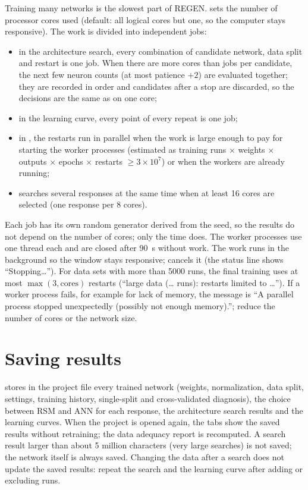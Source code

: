 Training many networks is the slowest part of REGEN.  sets the number of processor cores
used (default: all logical cores but one, so the computer stays responsive). The work is divided into independent
jobs:
\begin{itemize}
  \item in the architecture search, every combination of candidate network, data split and restart is one job.
    When there are more cores than jobs per candidate, the next few neuron counts (at most patience $+2$) are
    evaluated together; they are recorded in order and candidates after a stop are discarded, so the decisions are
    the same as on one core;
  \item in the learning curve, every point of every repeat is one job;
  \item in , the restarts run in parallel when the work is large enough to pay for starting the
    worker processes (estimated as training runs $\times$ weights $\times$ outputs $\times$ epochs $\times$
    restarts $\ge 3\times10^7$) or when the workers are already running;
  \item {} searches several responses at the same time when at least 16 cores
    are selected (one response per 8 cores).
\end{itemize}
Each job has its own random generator derived from the seed, so the results do not depend on the number of
cores; only the time does. The worker processes use one thread each and are closed after 90~s without work. The
work runs in the background so the window stays responsive;  cancels it (the status line shows
``Stopping\dots''). For data sets with more than 5000 runs, the final training uses at most $\max(3,
\text{cores})$ restarts (``large data (\dots{} runs): restarts limited to \dots''). If a worker process fails, for
example for lack of memory, the message is ``A parallel process stopped unexpectedly (possibly not enough
memory).''; reduce the number of cores or the network size.

\section{Saving results}\label{sec:ch07-saving}

 stores in the project file every trained network (weights, normalization, data
split, settings, training history, single-split and cross-validated diagnosis), the choice between RSM and ANN for
each response, the architecture search results and the learning curves. When the project is opened again, the
tabs show the saved results without retraining; the data adequacy report is recomputed. A search result larger
than about 5 million characters (very large searches) is not saved; the network itself is always saved. Changing
the data after a search does not update the saved results: repeat the search and the learning curve after adding
or excluding runs.

